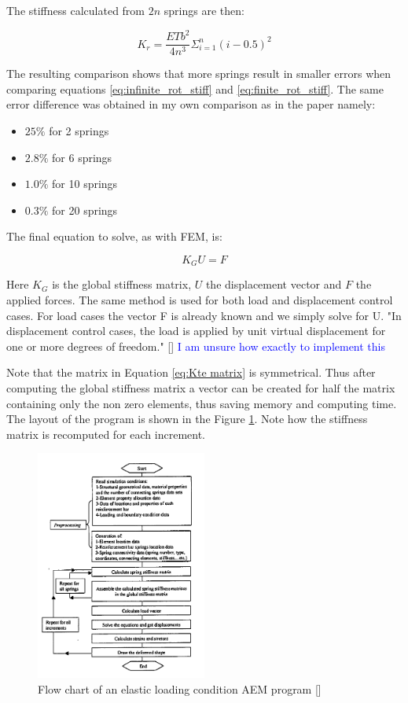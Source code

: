 The stiffness calculated from $2n$ springs are then:

\begin{equation}
K_r =  \frac{ETb^2}{4n^3} \Sigma^{n}_{i=1}(i - 0.5)^2
\label{eq:finite_rot_stiff}
\end{equation}

The resulting comparison shows that more springs result in smaller errors when comparing equations \ref{eq:infinite_rot_stiff} and \ref{eq:finite_rot_stiff}.  The same error difference was obtained in my own comparison as in the paper namely:

\begin{itemize}
\item $25 \%$ for 2 springs
\item $2.8 \%$ for 6 springs
\item $1.0 \%$ for 10 springs
\item $0.3 \%$ for 20 springs
\end{itemize}

The final equation to solve, as with FEM, is:

\begin{equation}
K_G U=F
\end{equation}

Here $K_G$ is the global stiffness matrix, $U$ the displacement vector and $F$ the applied forces. 
The same method is used for both load and displacement control cases.  For load cases the vector F is already known and we simply solve for U.  "In displacement control cases, the load is applied by unit virtual displacement for one or more degrees of freedom." [\cite{First_AEM}] \textcolor{blue}{I am unsure how exactly to implement this}
 
Note that the matrix in Equation \ref{eq:Kte matrix} is symmetrical.  Thus after computing the global stiffness matrix a vector can be created for half the matrix containing only the non zero elements, thus saving memory and computing time.  The layout of the program is shown in the Figure \ref{fig:AEM_flow_chart}.  Note how the stiffness matrix is recomputed for each increment. 

\begin{figure}[H]
\centering
\includegraphics[width=0.5\textwidth]{../AEM_flow_chart.png}
\caption{Flow chart of an elastic loading condition AEM program [\cite{First_AEM}]}
\label{fig:AEM_flow_chart}
\end{figure}

